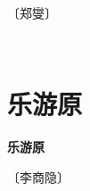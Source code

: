 \documentclass[12pt,UTF-8,openany,fontset=none]{ctexbook}
\begin{document}
\begin{center}
    \vspace{10pt}
    
    \begin{large}
        
        〔郑燮〕
        
    \end{large}
    
    \vspace{8pt}
    
    \begin{huge}
        
        \phantom{。}~~

        \phantom{。}
        
        \phantom{。}

        \phantom{。}
        
    \end{huge}
    
\end{center}

\vspace{8pt}
\clearpage


\section{乐游原}



\begin{center}
    {\bfseries 乐游原}
\end{center}

\begin{center}
    \vspace{10pt}
    
    \begin{large}
        
        〔李商隐〕
        
    \end{large}
    
    \vspace{8pt}
    
    \begin{huge}
        
        \phantom{。}~~

        \phantom{。}
        
        \phantom{。}

        \phantom{。}
        
    \end{huge}
    
\end{center}
\end{document}
